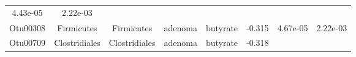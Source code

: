 \documentclass[11pt,]{article}
\begin{document}
\begin{longtable}[]{@{}cccccccc@{}}
\begin{minipage}[t]{0.08\columnwidth}
4.43e-05\strut
\end{minipage} & \begin{minipage}[t]{0.08\columnwidth}\centering\strut
2.22e-03\strut
\end{minipage}\tabularnewline
\begin{minipage}[t]{0.08\columnwidth}\centering\strut
Otu00308\strut
\end{minipage} & \begin{minipage}[t]{0.15\columnwidth}\centering\strut
Firmicutes\strut
\end{minipage} & \begin{minipage}[t]{0.15\columnwidth}\centering\strut
Firmicutes\strut
\end{minipage} & \begin{minipage}[t]{0.08\columnwidth}\centering\strut
adenoma\strut
\end{minipage} & \begin{minipage}[t]{0.09\columnwidth}\centering\strut
butyrate\strut
\end{minipage} & \begin{minipage}[t]{0.07\columnwidth}\centering\strut
-0.315\strut
\end{minipage} & \begin{minipage}[t]{0.08\columnwidth}\centering\strut
4.67e-05\strut
\end{minipage} & \begin{minipage}[t]{0.08\columnwidth}\centering\strut
2.22e-03\strut
\end{minipage}\tabularnewline
\begin{minipage}[t]{0.08\columnwidth}\centering\strut
Otu00709\strut
\end{minipage} & \begin{minipage}[t]{0.15\columnwidth}\centering\strut
Clostridiales\strut
\end{minipage} & \begin{minipage}[t]{0.15\columnwidth}\centering\strut
Clostridiales\strut
\end{minipage} & \begin{minipage}[t]{0.08\columnwidth}\centering\strut
adenoma\strut
\end{minipage} & \begin{minipage}[t]{0.09\columnwidth}\centering\strut
butyrate\strut
\end{minipage} & \begin{minipage}[t]{0.07\columnwidth}\centering\strut
-0.318\strut
\end{minipage} & \begin{minipage}[t]{0.08\columnwidth}\centering\strut

\end{minipage}
\end{longtable}
\end{document}

